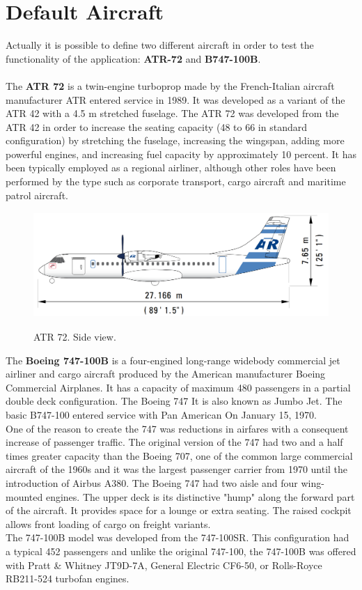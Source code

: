 
\section {Default Aircraft}
Actually it is possible to define two different aircraft in order to test the functionality of the application: {\bfseries ATR-72}  and {\bfseries B747-100B}. \\ \\

The {\bfseries ATR 72} is a twin-engine turboprop made by the French-Italian aircraft manufacturer ATR entered service in 1989.  It was developed as a variant of the ATR 42  with a 4.5 m stretched fuselage.  The ATR 72 was developed from the ATR 42 in order to increase the seating capacity (48 to 66 in standard configuration) by stretching the fuselage, increasing the wingspan, adding more powerful engines, and increasing fuel capacity by approximately 10 percent.\cite{atr:atr} It has been typically employed as a regional airliner, although other roles have been performed by the type such as corporate transport, cargo aircraft and maritime patrol aircraft. \cite{wiki:atr}


\begin{figure}[H]
\centering
{\includegraphics[height=4cm]{Immagini/atr72mod.jpg}} 
\caption{ATR 72. Side view.}
\end{figure}


The {\bfseries Boeing 747-100B} is a four-engined long-range widebody commercial jet airliner and cargo aircraft  produced by the American manufacturer Boeing Commercial Airplanes. It has a capacity of maximum 480 passengers in a partial double deck configuration. The Boeing 747 It is also known as Jumbo Jet. The basic B747-100 entered service with Pan American On January 15, 1970.\\
One of the reason to create the 747 was reductions in airfares with a consequent increase of passenger traffic\cite{wiki:boeing}. The original version of the 747 had two and a half times greater capacity than the Boeing 707, one of the common large commercial aircraft of the 1960s and it was the largest passenger carrier from 1970 until the introduction of Airbus A380.\cite{boeing:boeing}
The Boeing 747 had two aisle and four wing-mounted engines. The upper deck is its distinctive "hump" along the forward part of the aircraft. It provides space for a lounge or extra seating. The raised cockpit allows front loading of cargo on freight variants. \\
The 747-100B model was developed from the 747-100SR. This configuration had a typical 452 passengers and unlike the original 747-100, the 747-100B was offered with Pratt \& Whitney JT9D-7A, General Electric CF6-50, or Rolls-Royce RB211-524 turbofan engines.

